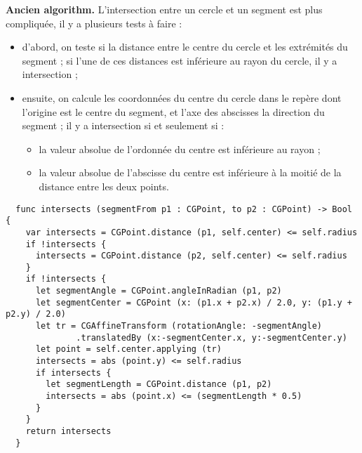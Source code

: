 {\bf Ancien algorithm.} L'intersection entre un cercle et un segment est plus compliquée, il y a plusieurs tests à faire :
\begin{itemize}
\item d'abord, on teste si la distance entre le centre du cercle et les extrémités du segment ; si l'une de ces distances est inférieure au rayon du cercle, il y a intersection ;
\item ensuite, on calcule les coordonnées du centre du cercle dans le repère dont l'origine est le centre du segment, et l'axe des abscisses la direction du segment ; il y a intersection si et seulement si :
  \begin{itemize}
  \item la valeur absolue de l'ordonnée du centre est inférieure au rayon ;
  \item la valeur absolue de l'abscisse du centre est inférieure à la moitié de la distance entre les deux points.
  \end{itemize}
\end{itemize}

\begin{center}
\end{center}


\begin{lstlisting}
  func intersects (segmentFrom p1 : CGPoint, to p2 : CGPoint) -> Bool {
    var intersects = CGPoint.distance (p1, self.center) <= self.radius
    if !intersects {
      intersects = CGPoint.distance (p2, self.center) <= self.radius
    }
    if !intersects {
      let segmentAngle = CGPoint.angleInRadian (p1, p2)
      let segmentCenter = CGPoint (x: (p1.x + p2.x) / 2.0, y: (p1.y + p2.y) / 2.0)
      let tr = CGAffineTransform (rotationAngle: -segmentAngle)
              .translatedBy (x:-segmentCenter.x, y:-segmentCenter.y)
      let point = self.center.applying (tr)
      intersects = abs (point.y) <= self.radius
      if intersects {
        let segmentLength = CGPoint.distance (p1, p2)
        intersects = abs (point.x) <= (segmentLength * 0.5)
      }
    }
    return intersects
  }
\end{lstlisting}

